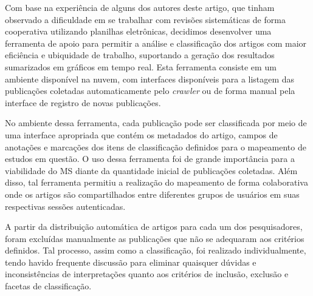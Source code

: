 
Com base na experi\^{e}ncia de alguns dos autores deste artigo, que tinham observado a dificuldade em se trabalhar com revis\~{o}es sistem\'{a}ticas de forma cooperativa utilizando planilhas eletr\^{o}nicas, decidimos desenvolver uma ferramenta de apoio para permitir a an\'{a}lise e 
classifica\c c\~{a}o dos artigos com maior eficiência e ubiquidade de trabalho, suportando a gera\c c\~{a}o dos 
resultados sumarizados em gr\'{a}ficos 
em tempo real. Esta ferramenta consiste em um ambiente disponível na nuvem, com interfaces disponíveis para a listagem das publicações coletadas automaticamente pelo \emph{crawler} ou de forma manual pela interface de registro de novas publicações.

No ambiente dessa ferramenta, cada publicação pode ser classificada por meio de uma interface apropriada que contém os metadados do artigo, campos de anotações e marcações dos itens de classificação definidos para o mapeamento de estudos em questão. O uso dessa ferramenta foi de grande importância para a viabilidade do MS diante da quantidade inicial de publicações coletadas. Al\'{e}m disso, tal ferramenta permitiu 
a realiza\c{c}\~{a}o do mapeamento de forma colaborativa onde os artigos s\~{a}o compartilhados entre diferentes grupos de usuários em suas respectivas sess\~{o}es autenticadas.

A partir da distribuição automática de artigos para cada um dos pesquisadores, foram excluídas manualmente as publicações que não se adequaram aos critérios definidos. Tal processo, assim como a classificação, foi realizado individualmente, tendo havido frequente discussão para eliminar quaisquer dúvidas e inconsistências de interpretações quanto aos critérios de inclusão, exclusão e facetas de classificação. 

